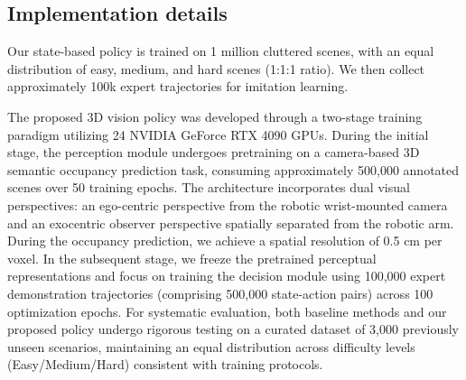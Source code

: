 \subsection{Implementation details}

Our state-based policy is trained on 1 million cluttered scenes, with an equal distribution of easy, medium, and hard scenes (1:1:1 ratio). We then collect approximately 100k expert trajectories for imitation learning.

The proposed 3D vision policy was developed through a two-stage training paradigm utilizing 24 NVIDIA GeForce RTX 4090 GPUs. During the initial stage, the perception module undergoes pretraining on a camera-based 3D semantic occupancy prediction task, consuming approximately 500,000 annotated scenes over 50 training epochs. The architecture incorporates dual visual perspectives: an ego-centric perspective from the robotic wrist-mounted camera and an exocentric observer perspective spatially separated from the robotic arm. During the occupancy prediction, we achieve a spatial resolution of 0.5 cm per voxel. In the subsequent stage, we freeze the pretrained perceptual representations and focus on training the decision module using 100,000 expert demonstration trajectories (comprising 500,000 state-action pairs) across 100 optimization epochs. For systematic evaluation, both baseline methods and our proposed policy undergo rigorous testing on a curated dataset of 3,000 previously unseen scenarios, maintaining an equal distribution across difficulty levels (Easy/Medium/Hard) consistent with training protocols.


